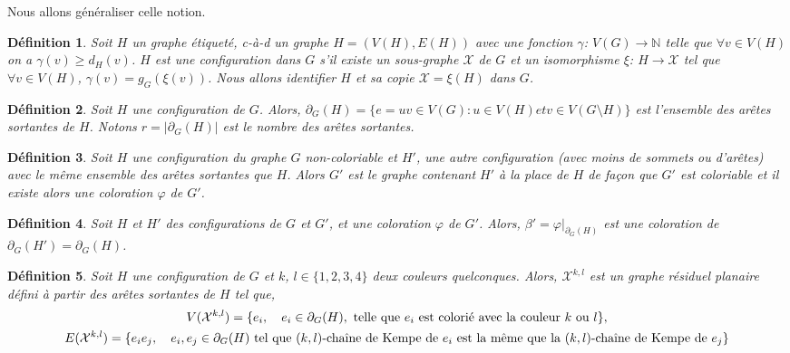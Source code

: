 \documentclass[10pt,a4paper]{article}
\newtheorem{definition}{Définition}
\begin{document}
Nous allons généraliser celle notion.

\begin{definition}
Soit $H$ un graphe étiqueté, c-à-d un graphe $H= (V(H), E(H))$ avec une fonction $\gamma$: $V(G) \to \mathbb{N}$ telle que $\forall v \in V(H)$ on a $\gamma(v) \geq d_H(v)$. $H$ est une configuration dans $G$ s'il existe un sous-graphe $\mathcal{X}$ de $G$ et un isomorphisme $\xi$: $H \to \mathcal{X}$ tel que $\forall v \in V(H)$, $\gamma(v) = g_G(\xi(v))$. Nous allons identifier $H$ et sa copie $\mathcal{X}=\xi(H)$ dans $G$.
\label{de:conf}
\end{definition}

\begin{definition}
Soit $H$ une configuration de $G$. Alors, $\partial_G(H) = \{e =uv \in V(G) : u \in V(H) et v \in V(G \setminus H)\}$ est l'ensemble des arêtes sortantes de $H$. Notons $r=|\partial_G(H)|$ est le nombre des arêtes sortantes.
\label{de:ring}
\end{definition}

\begin{definition}
Soit $H$ une configuration du graphe $G$ non-coloriable et $H'$, une autre configuration (avec moins de sommets ou d'arêtes) avec le même ensemble des arêtes sortantes que $H$. Alors $G'$ est le graphe contenant $H'$ à la place de $H$ de façon que $G'$ est coloriable et il existe alors une coloration $\varphi$ de $G'$.
\end{definition}

\begin{definition}
Soit $H$ et $H'$ des configurations de $G$ et $G'$, et une coloration $\varphi$ de $G'$. Alors, $\beta' = \varphi|_{\partial_G(H)}$ est une coloration de $\partial_G(H')=\partial_G(H)$.
\end{definition}

\begin{definition}
Soit $H$ une configuration de $G$ et $k$, $l \in \{1,2,3,4\}$ deux couleurs quelconques. Alors, $\mathcal{X}^{k,l}$ est un graphe résiduel planaire défini à partir des arêtes sortantes de $H$ tel que, 
$$
\gathered
V(\mathcal{X}^{k,l}) = \{e_i, \quad e_i \in \partial_G(H), \textrm{ telle que $e_i$ est colorié avec la couleur $k$ ou $l$}\}, \\
E(\mathcal{X}^{k,l}) = \{ e_ie_j, \quad e_i, e_j \in \partial_G(H)  \textrm{ tel que $(k,l)$-chaîne de Kempe de $e_i$ est la même que la $(k,l)$-chaîne de Kempe de $e_j$}\} 
\endgathered
$$
\end{definition}
\end{document}
